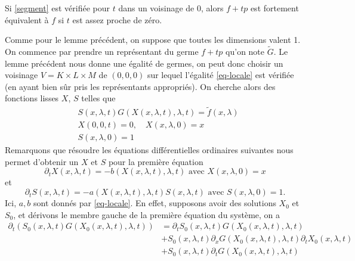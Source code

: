 \documentclass[memoire.tex]{subfiles}
\begin{document}
\begin{lemme}
        Si \ref{segment} est vérifiée pour $t$ dans un voisinage de $0$, alors $f+tp$ est fortement équivalent à $f$ si $t$ est assez proche de zéro.
\end{lemme}
\begin{preuve}
    Comme pour le lemme précédent, on suppose que toutes les dimensions valent 1.
    On commence par prendre un représentant du 
    germe $f+tp$ qu'on note $\tilde{G}$. Le 
    lemme précédent nous donne une égalité de 
    germes, on peut donc choisir un voisinage 
    $V=K\times L\times M$ de $(0,0,0)$ sur lequel l'égalité
    \ref{eq-locale} est vérifiée (en ayant bien sûr pris les représentants appropriés). On cherche alors des fonctions lisses $X$, $S$ telles que
    \begin{equation}\label{Big-syst}
    \begin{aligned}
        &S(x,\lambda,t)G(X(x,\lambda,t),\lambda,t)=\tilde{f}(x,\lambda)\\
        &X(0,0,t)=0,\quad X(x,\lambda,0)=x \\
        & S(x,\lambda,0)=1
    \end{aligned}
    \end{equation}
    Remarquons que résoudre les équations différentielles ordinaires suivantes nous permet d'obtenir un $X$ et $S$ pour la première équation
    \begin{equation}\label{equa-diff-1}
        \partial_t X (x,\lambda,t)=-b(X(x,\lambda,t),\lambda,t)\text{ avec } X(x,\lambda,0)=x
    \end{equation}
    et
    \begin{equation}\label{equa-diff-2}
        \partial_t S (x,\lambda,t)=-a(X(x,\lambda,t),\lambda,t) S(x,\lambda,t)\text{ avec } S(x,\lambda,0)=1.
    \end{equation}
    Ici, $a,b$ sont donnés par \ref{eq-locale}. En effet, supposons avoir des solutions $X_0$ et $S_0$, et dérivons le membre gauche de la première équation du système, on a 
    \begin{equation}\label{sol-syst}
    \begin{aligned}
        \partial_t\left( S_0(x,\lambda,t)G(X_0(x,\lambda,t),\lambda,t)\right)
        &=\partial_t S_0(x,\lambda,t)G(X_0(x,\lambda,t),\lambda,t)\\
        &+ S_0(x,\lambda,t)\partial_x G(X_0(x,\lambda,t),\lambda,t)\partial_t X_0(x,\lambda,t)\\
        &+S_0(x,\lambda,t)\partial_t G(X_0(x,\lambda,t),\lambda,t)

\end{aligned}
\end{equation}
\end{preuve}
\end{document}

